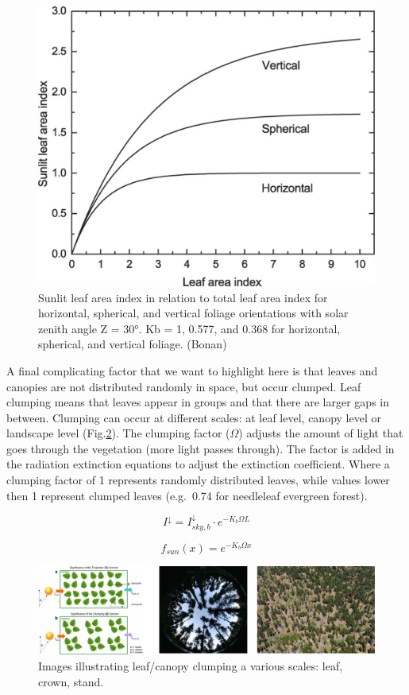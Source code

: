 \documentclass[
  12pt,
  oneside]{book}
\begin{document}
\begin{figure}

{\centering \includegraphics[width=0.8\linewidth]{figures/chap3/f314_sunlit} 

}

\caption{Sunlit leaf area index in relation to total leaf area index for horizontal, spherical, and vertical foliage orientations with solar zenith angle Ζ = 30°. Kb = 1, 0.577, and 0.368 for horizontal, spherical, and vertical foliage. (Bonan)}\label{fig:f314}
\end{figure}

A final complicating factor that we want to highlight here is that leaves and canopies are not distributed randomly in space, but occur clumped. Leaf clumping means that leaves appear in groups and that there are larger gaps in between. Clumping can occur at different scales: at leaf level, canopy level or landscape level (Fig.\ref{fig:f315}). The clumping factor (\(\Omega\)) adjusts the amount of light that goes through the vegetation (more light passes through). The factor is added in the radiation extinction equations to adjust the extinction coefficient. Where a clumping factor of 1 represents randomly distributed leaves, while values lower then 1 represent clumped leaves (e.g.~0.74 for needleleaf evergreen forest).

\[
I^{\downarrow} = I^{\downarrow}_{sky,b}\cdot e^{-K_b \Omega L}
\]

\[
f_{sun} (x) = e^{-K_b \Omega x}
\]

\begin{figure}

{\centering \includegraphics[width=0.8\linewidth]{figures/chap3/f315_clumping} 

}

\caption{Images illustrating leaf/canopy clumping a various scales: leaf, crown, stand.}\label{fig:f315}
\end{figure}
\end{document}
